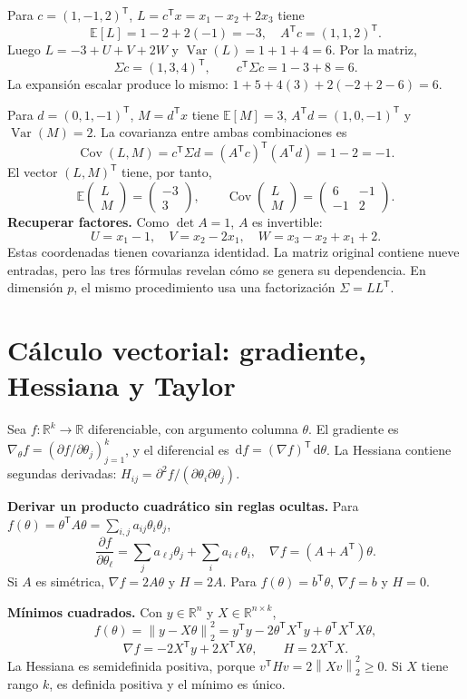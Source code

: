 \documentclass[11pt,a4paper]{article}
\newcommand{\R}{\mathbb R}
\newcommand{\E}{\mathbb E}
\newcommand{\T}{^{\mathsf T}}
\newcommand{\dd}{\,\mathrm d}
\newcommand{\norm}[1]{\left\lVert #1\right\rVert}
\DeclareMathOperator{\Var}{Var}
\DeclareMathOperator{\Cov}{Cov}
\newcommand{\topic}[2]{\clearpage\section{#1}\label{#2}}
\theoremstyle{definition}\newtheorem{definicion}[teorema]{Definición}
\begin{document}
\begin{ejemplo}
Para $c=(1,-1,2)\T$, $L=c\T x=x_1-x_2+2x_3$ tiene
\[
\E[L]=1-2+2(-1)=-3,\quad
A\T c=(1,1,2)\T.
\]
Luego $L=-3+U+V+2W$ y $\Var(L)=1+1+4=6$. Por la matriz,
\[
\Sigma c=(1,3,4)\T,\qquad c\T\Sigma c=1-3+8=6.
\]
La expansión escalar produce lo mismo:
$1+5+4(3)+2(-2+2-6)=6$.
\end{ejemplo}
Para $d=(0,1,-1)\T$, $M=d\T x$ tiene
$\E[M]=3$, $A\T d=(1,0,-1)\T$ y $\Var(M)=2$.
La covarianza entre ambas combinaciones es
\[
\Cov(L,M)=c\T\Sigma d=(A\T c)\T(A\T d)=1-2=-1.
\]
El vector $(L,M)\T$ tiene, por tanto,
\[
\E\begin{pmatrix}L\\M\end{pmatrix}
=\begin{pmatrix}-3\\3\end{pmatrix},\qquad
\Cov\begin{pmatrix}L\\M\end{pmatrix}
=\begin{pmatrix}6&-1\\-1&2\end{pmatrix}.
\]
\textbf{Recuperar factores.} Como $\det A=1$, $A$ es invertible:
\[
U=x_1-1,\quad
V=x_2-2x_1,\quad
W=x_3-x_2+x_1+2.
\]
Estas coordenadas tienen covarianza identidad.
La matriz original contiene nueve entradas, pero las tres fórmulas
revelan cómo se genera su dependencia. En dimensión $p$, el mismo
procedimiento usa una factorización $\Sigma=LL\T$.

\topic{Cálculo vectorial: gradiente, Hessiana y Taylor}{s15}
Sea $f:\R^k\to\R$ diferenciable, con argumento columna $\theta$.
El gradiente es $\nabla_\theta f=(\partial f/\partial\theta_j)_{j=1}^k$,
y el diferencial es $\dd f=(\nabla f)\T\dd\theta$.
La Hessiana contiene segundas derivadas:
$H_{ij}=\partial^2f/(\partial\theta_i\partial\theta_j)$.

\textbf{Derivar un producto cuadrático sin reglas ocultas.}
Para $f(\theta)=\theta\T A\theta=\sum_{i,j}a_{ij}\theta_i\theta_j$,
\[
\frac{\partial f}{\partial\theta_\ell}
=\sum_ja_{\ell j}\theta_j+\sum_i a_{i\ell}\theta_i,
\quad
\boxed{\nabla f=(A+A\T)\theta}.
\]
Si $A$ es simétrica, $\nabla f=2A\theta$ y $H=2A$.
Para $f(\theta)=b\T\theta$, $\nabla f=b$ y $H=0$.

\textbf{Mínimos cuadrados.} Con $y\in\R^n$ y $X\in\R^{n\times k}$,
\[
f(\theta)=\norm{y-X\theta}_2^2
=y\T y-2\theta\T X\T y+\theta\T X\T X\theta,
\]
\[
\nabla f=-2X\T y+2X\T X\theta,\qquad H=2X\T X.
\]
La Hessiana es semidefinida positiva, porque
$v\T Hv=2\norm{Xv}_2^2\ge0$. Si $X$ tiene rango $k$,
es definida positiva y el mínimo es único.
\end{document}
